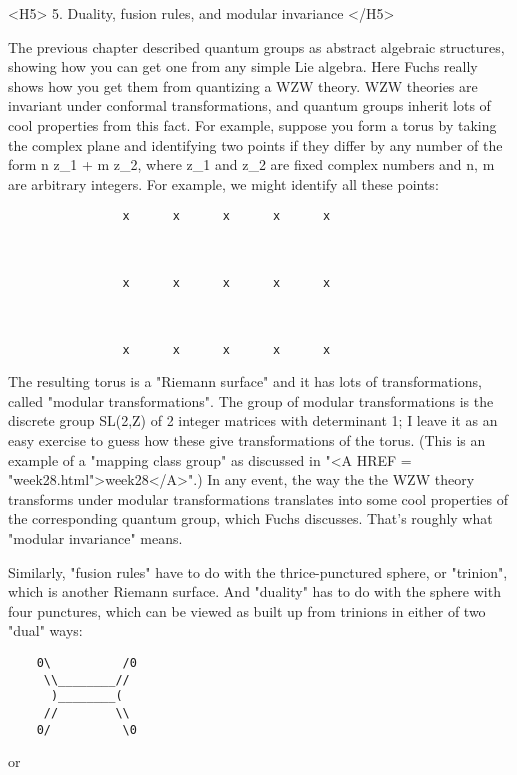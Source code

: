 <H5> 5.  Duality, fusion rules, and modular invariance </H5>

The previous chapter described quantum groups as abstract algebraic
structures, showing how you can get one from any simple Lie algebra.
Here Fuchs really shows how you get them from quantizing a WZW theory.
WZW theories are invariant under conformal transformations, and
quantum groups inherit lots of cool properties from this fact.  For
example, suppose you form a torus by taking the complex plane
and identifying two points if they differ by any number of the form
n z_{1} + m z_{2}, where z_{1} and z_{2} 
are fixed complex numbers and n, m are arbitrary integers.  For example, 
we might identify all these points:


\begin{verbatim}
                x      x      x      x      x



                x      x      x      x      x



                x      x      x      x      x

\end{verbatim}
    

The resulting torus is a "Riemann surface" and it has lots of
transformations, called "modular transformations".  The group of
modular transformations is the discrete group SL(2,Z) of 2 integer
matrices with determinant 1; I leave it as an easy exercise to guess
how these give transformations of the torus.  (This is an example of a
"mapping class group" as discussed in "<A HREF =
"week28.html">week28</A>".)  In any event, the way the the WZW theory
transforms under modular transformations translates into some cool
properties of the corresponding quantum group, which Fuchs discusses.
That's roughly what "modular invariance" means.

Similarly, "fusion rules" have to do with the thrice-punctured sphere,
or "trinion", which is another Riemann surface.  And "duality" has
to do with the sphere with four punctures, which can be viewed as
built up from trinions in either of two "dual" ways:

\begin{verbatim}
    0\          /0
     \\________//
      )________(
     //        \\
    0/          \0
\end{verbatim}
    

or

